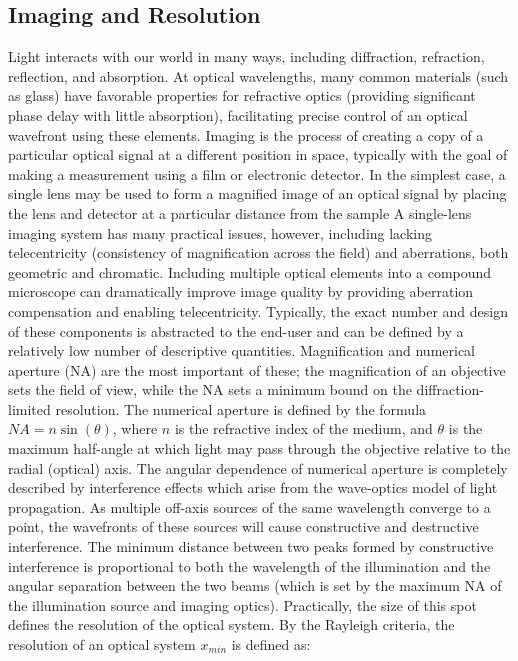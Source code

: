 \subsection{Imaging and Resolution}
Light interacts with our world in many ways, including diffraction, refraction, reflection, and absorption. At optical wavelengths, many common materials (such as glass) have favorable properties for refractive optics (providing significant phase delay with little absorption), facilitating precise control of an optical wavefront using these elements. Imaging is the process of creating a copy of a particular optical signal at a different position in space, typically with the goal of making a measurement using a film or electronic detector. In the simplest case, a single lens may be used to form a magnified image of an optical signal by placing the lens and detector at a particular distance from the sample A single-lens imaging system has many practical issues, however, including lacking telecentricity (consistency of magnification across the field) and aberrations, both geometric and chromatic. Including multiple optical elements into a compound microscope can dramatically improve image quality by providing aberration compensation and enabling telecentricity. Typically, the exact number and design of these components is abstracted to the end-user and can be defined by a relatively low number of descriptive quantities. Magnification and numerical aperture (NA) are the most important of these; the magnification of an objective sets the field of view, while the NA sets a minimum bound on the diffraction-limited resolution. The numerical aperture is defined by the formula $NA=n\sin (\theta)$, where $n$ is the refractive index of the medium, and $\theta$ is the maximum half-angle at which light may pass through the objective relative to the radial (optical) axis. The angular dependence of numerical aperture is completely described by interference effects which arise from the wave-optics model of light propagation. As multiple off-axis sources of the same wavelength converge to a point, the wavefronts of these sources will cause constructive and destructive interference. The minimum distance between two peaks formed by constructive interference is proportional to both the wavelength of the illumination and the angular separation between the two beams (which is set by the maximum NA of the illumination source and imaging optics). Practically, the size of this spot defines the resolution of the optical system. By the Rayleigh criteria, the resolution of an optical system $x_{min}$ is defined as:

